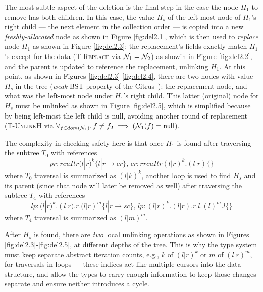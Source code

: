 The most subtle aspect of the deletion is the final step in the case the node $H_1$ to remove has both children. In this case, the value $H_s$ of the left-most node of $H_1$'s right child --- the next element in the collection order --- is copied into a new \textit{freshly-allocated} node as shown in Figure \ref{fig:del2.1}, which is then used to \emph{replace} node $H_1$ as shown in Figure \ref{fig:del2.3}: the replacement's fields exactly match $H_1$'s except for the data (\textsc{T-Replace} via $\mathcal{N}_1 = \mathcal{N}_2$) as showin in Figure \ref{fig:del2.2}, and the parent is updated to reference the replacement, unlinking $H_1$. At this point, as shown in Figures \ref{fig:del2.3}-\ref{fig:del2.4}, there are two nodes with value $H_s$ in the tree (\textit{weak} BST property of the Citrus~\cite{Arbel:2014:CUR:2611462.2611471}): the replacement node, and what was the left-most node under $H_1$'s right child. This latter (original) node for $H_s$ must be unlinked as shown in Figure \ref{fig:del2.5}, which is simplified because by being left-most the left child is null, avoiding another round of replacement (\textsc{T-UnlinkH} via $\forall_{f\in dom(\mathcal{N}_1)} \ldotp f\neq f_2 \implies (\mathcal{N}_1(f) = \textsf{null}$).

The complexity in checking safety here is that once $H_1$ is found after traversing the subtree $T_0$ with references
\[ pr:rcuItr(l|r)^{k} \{l|r \rightarrow cr\},\, cr:rrcuItr(l|r)^{k}.(l|r) \{\}\]
where $T_0$ traversal is summarized as $(l|k)^{k}$, another loop is used to find $H_s$ and its parent (since that node will later be removed as well) after traversing the subtree $T_4$ with references
\[lp:(l|r)^{k}.(l|r).r.(l|r)^{m} \{l|r \rightarrow sc\},\, lp:(l|r)^{k}.(l|r).r.l.(l)^{m}.l\{\}\]
where $T_4$ traversal is summarized as $(l|m)^{m}$.

After $H_s$ is found, there are \emph{two} local unlinking operations as shown in Figures \ref{fig:del2.3}-\ref{fig:del2.5}, at different depths of the tree.  This is why the type system must keep separate abstract iteration counts, e.g., $k$ of $(l|r)^{k}$ or $m$ of $(l|r)^{m}$, for traversals in loops --- these indices act like multiple cursors into the data structure, and allow the types to carry enough information to keep those changes separate and ensure neither introduces a cycle.

